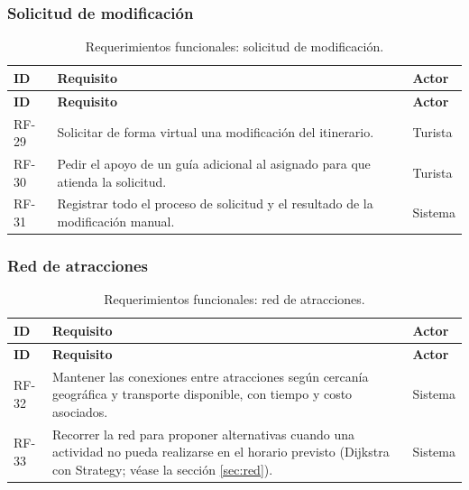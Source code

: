 \documentclass[11pt,a4paper]{article}
\begin{document}
\subsubsection{Solicitud de modificación}
{\footnotesize\setlength{\tabcolsep}{3pt}\renewcommand{\arraystretch}{1.15}
\begin{longtable}{|>{\raggedright\arraybackslash}p{1.28cm}|>{\raggedright\arraybackslash}p{11.28cm}|>{\raggedright\arraybackslash}p{2.98cm}|}
\caption{Requerimientos funcionales: solicitud de modificación.}\label{tab:rf-modificacion}\\ \hline
\rowcolor{gray!20} \textbf{ID} & \textbf{Requisito} & \textbf{Actor} \\ \hline
\endfirsthead
\hline \rowcolor{gray!20} \textbf{ID} & \textbf{Requisito} & \textbf{Actor} \\ \hline
\endhead
RF-29 & Solicitar de forma virtual una modificación del itinerario. & Turista \\ \hline
RF-30 & Pedir el apoyo de un guía adicional al asignado para que atienda la solicitud. & Turista \\ \hline
RF-31 & Registrar todo el proceso de solicitud y el resultado de la modificación manual. & Sistema \\ \hline
\end{longtable}}
\vspace{2pt}
\subsubsection{Red de atracciones}
{\footnotesize\setlength{\tabcolsep}{3pt}\renewcommand{\arraystretch}{1.15}
\begin{longtable}{|>{\raggedright\arraybackslash}p{1.28cm}|>{\raggedright\arraybackslash}p{11.28cm}|>{\raggedright\arraybackslash}p{2.98cm}|}
\caption{Requerimientos funcionales: red de atracciones.}\label{tab:rf-red}\\ \hline
\rowcolor{gray!20} \textbf{ID} & \textbf{Requisito} & \textbf{Actor} \\ \hline
\endfirsthead
\hline \rowcolor{gray!20} \textbf{ID} & \textbf{Requisito} & \textbf{Actor} \\ \hline
\endhead
RF-32 & Mantener las conexiones entre atracciones según cercanía geográfica y transporte disponible, con tiempo y costo asociados. & Sistema \\ \hline
RF-33 & Recorrer la red para proponer alternativas cuando una actividad no pueda realizarse en el horario previsto (Dijkstra con Strategy; véase la sección \ref{sec:red}). & Sistema \\ \hline
\end{longtable}}
\vspace{2pt}
\end{document}

